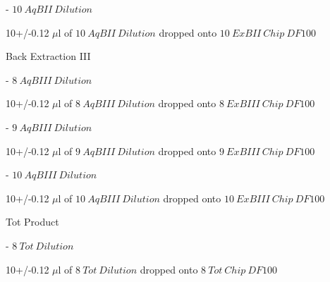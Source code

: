 \documentclass[idxtotoc,hyperref,openany,oneside]{labbook} %
\newcommand{\cmark}{\ding{51}}%
\newcommand{\done}{\rlap{$\square$}{\raisebox{2pt}{\large\hspace{1pt}\cmark}}%
  \hspace{-2.5pt}}
\begin{document}
\begin{todolist}
  \begin{todolist}
  \item[\done]{- $\boxed{10\ AqBII\ Dilution}$}
  \end{todolist}
  \vspace{0.3cm}
  \begin{center}
    10+/-0.12 $\mu$l of $\boxed{10\ AqBII\ Dilution}$ dropped onto
    $\boxed{10\ ExBII\ Chip\ DF100}$
  \end{center}

\item[\done]{Back Extraction III}

  \begin{todolist}
  \item[\done]{- $\boxed{8\ AqBIII\ Dilution}$}
  \end{todolist}
  \vspace{0.3cm}
  \begin{center}
    10+/-0.12 $\mu$l of $\boxed{8\ AqBIII\ Dilution}$ dropped onto
    $\boxed{8\ ExBIII\ Chip\ DF100}$
  \end{center}
  
  \begin{todolist}
  \item[\done]{- $\boxed{9\ AqBIII\ Dilution}$}
  \end{todolist}
  \vspace{0.3cm}
  \begin{center}
    10+/-0.12 $\mu$l of $\boxed{9\ AqBIII\ Dilution}$ dropped onto
    $\boxed{9\ ExBIII\ Chip\ DF100}$
  \end{center}

  \begin{todolist}
  \item[\done]{- $\boxed{10\ AqBIII\ Dilution}$}
  \end{todolist}
  \vspace{0.3cm}
  \begin{center}
    10+/-0.12 $\mu$l of $\boxed{10\ AqBIII\ Dilution}$ dropped onto
    $\boxed{10\ ExBIII\ Chip\ DF100}$
  \end{center}

\item[\done]{Tot Product}

  \begin{todolist}
  \item[\done]{- $\boxed{8\ Tot\ Dilution}$}
  \end{todolist}
  \vspace{0.3cm}
  \begin{center}
    10+/-0.12 $\mu$l of $\boxed{8\ Tot\ Dilution}$ dropped onto
    $\boxed{8\ Tot\ Chip\ DF100}$
  \end{center}
  

\end{todolist}
\end{document}
